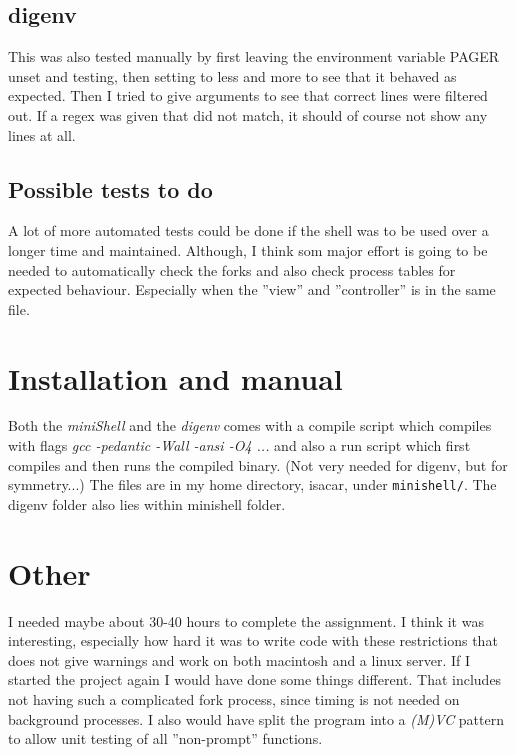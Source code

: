 \documentclass{article}
\begin{document}
    \subsection{digenv}
        This was also tested manually by first leaving the environment variable
        PAGER unset and testing, then setting to less and more to see that it
        behaved as expected. Then I tried to give arguments to see that correct
        lines were filtered out. If a regex was given that did not match, it
        should of course not show any lines at all.

    \subsection{Possible tests to do}
        A lot of more automated tests could be done if the shell was to be used
        over a longer time and maintained. Although, I think som major effort
        is going to be needed to automatically check the forks and also check
        process tables for expected behaviour. Especially when the ''view'' and
        ''controller'' is in the same file.
        

\section{Installation and manual}
    Both the \emph{miniShell} and the \emph{digenv} comes with a compile script
    which compiles with flags \emph{gcc -pedantic -Wall -ansi -O4 ...} and also a
    run script which first compiles and then runs the compiled binary. (Not very
    needed for digenv, but for symmetry...) The files are in my home directory,
    isacar, under \texttt{minishell/}. The digenv folder also lies within minishell
    folder.

\section{Other}
    I needed maybe about 30-40 hours to complete the assignment. I think it was
    interesting, especially how hard it was to write code with these restrictions
    that does not give warnings and work on both macintosh and a linux server.
    If I started the project again I would have done some things different. That
    includes not having such a complicated fork process, since timing is not needed
    on background processes. I also would have split the program into a \emph{(M)VC}
    pattern to allow unit testing of all ''non-prompt'' functions.
\end{document}

